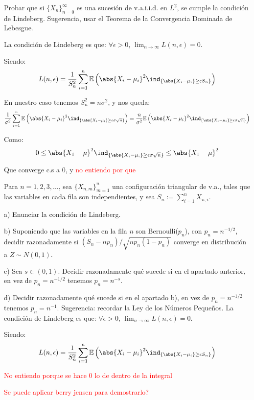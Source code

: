 \begin{problem}[10]Probar que si $\{X_n\}_{n=0}^{\infty}$  es una sucesi\'on de v.a.i.i.d. en $L^2$, se cumple
la condici\'on de Lindeberg. Sugerencia, usar el Teorema de la Convergencia Dominada de
Lebesgue.

\solution
La condición de Lindeberg es que:
$\forall \epsilon>0$, $\lim_{n \rightarrow \infty} L(n, \epsilon)=0$.

Siendo:
\[
L(n, \epsilon)= \frac{1}{S^2_n}\sum_{i=1}^{n}\mathbb{E}\left( \abs{X_i-\mu_i}^2 \ind_{\{\abs{X_i - \mu_i} \geq \epsilon S_n\}} \right)
\]

En nuestro caso tenemos $S_n^2=n \sigma^2$, y nos queda:
\[
\frac{1}{ \sigma^2}\sum_{i=1}^{n}\mathbb{E}\left( \abs{X_i-\mu_i}^2 \ind_{\{\abs{X_i - \mu_i} \geq \epsilon \sigma \sqrt{n}\}} \right) = \frac{n}{ \sigma^2}\mathbb{E}\left( \abs{X_i-\mu_i}^2 \ind_{\{\abs{X_i - \mu_i} \geq \epsilon \sigma \sqrt{n}\}} \right)
\]

Como:
\[
0 \leq \abs{X_1 - \mu}^2\ind_{\{\abs{X_i - \mu_i} \geq \epsilon \sigma \sqrt{n}\}} \leq \abs{X_1 - \mu}^2
\]

Que converge c.s a 0, y \textcolor{red}{no entiendo por que}

\end{problem}


\begin{problem}[11]Para $n=1, 2, 3, \dots$, sea  $\{X_{n, m}\}_{m=1}^{n}$  una configuraci\'on triangular de v.a., tales que las variables en cada fila son independientes, y sea $S_{n} := \sum_{i=1}^n X_{n, i}$.

a) Enunciar la condici\'on de Lindeberg.

b) Suponiendo que las variables en la fila $n$ son Bernoulli($p_n$), con
$p_n = n^{- 1/2}$,
decidir razonadamente
si 
$(S_n - n p_n)/\sqrt{n p_n (1 - p_n)}$ converge en distribuci\'on a $Z\sim N(0,1)$.

c) Sea $s \in (0,1)$. Decidir razonadamente qu\'e sucede si en el apartado anterior, en
vez de  $p_n = n^{ - 1/2}$ tenemos $p_n = n^{ - s}$.

d) Decidir razonadamente qu\'e sucede si en el apartado b), en
vez de  $p_n = n^{- 1/2}$ tenemos $p_n = n^{ - 1}$.
Sugerencia: recordar la Ley de los N\'umeros Peque\~nos.
\solution
\spart La condición de Lindeberg es que:
$\forall \epsilon>0$, $\lim_{n \rightarrow \infty} L(n, \epsilon)=0$.

Siendo:
\[
L(n, \epsilon)= \frac{1}{S^2_n}\sum_{i=1}^{n}\mathbb{E}\left( \abs{X_i-\mu_i}^2 \ind_{\{\abs{X_i - \mu_i} \geq \epsilon S_n\}} \right)
\]

\spart 
\textcolor{red}{No entiendo porque se hace 0 lo de dentro de la integral}

\textcolor{red}{Se puede aplicar berry jensen para demostrarlo?}

\end{problem}

